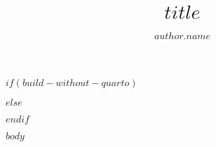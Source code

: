 \documentclass[
    $if(classoption)$
    $for(classoption)$$classoption$$sep$,$endfor$
    $endif$
]{$documentclass$}
\title{$title$}
\author[$author.index$]{$author.name$\thinspace\orcidlink{$author.orcid$}\thinspace}
\affil[$author.index$]{$author.affiliation$\thinspace}
\date{}
\begin{document}
$if(build-without-quarto)$
    \maketitle
$else$

$endif$

    $body$


\printbibliography
\end{document}
